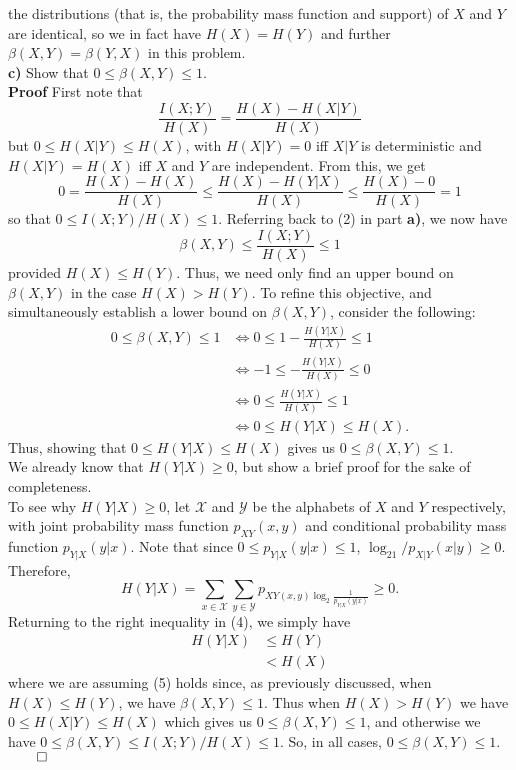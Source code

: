 \documentclass[11pt, letterpaper]{article}
\newcommand{\mc}[1]{\mathcal{#1}}
\begin{document}
the distributions (that is, the probability mass function and support) of $X$ and $Y$ are identical, so we in fact have $H(X)=H(Y)$ and further $\beta(X,Y)=\beta(Y,X)$ in this problem.\\[10pt]
{\bf c)} Show that $0\leq \beta(X,Y)\leq 1$.\\[10pt]
{\bf Proof} First note that
\[\frac{I(X;Y)}{H(X)}=\frac{H(X)-H(X|Y)}{H(X)}\]
but $0\leq H(X|Y)\leq H(X)$, with $H(X|Y)=0$ iff $X|Y$ is deterministic and $H(X|Y)=H(X)$ iff $X$ and $Y$ are independent.
From this, we get
\[0=\frac{H(X)-H(X)}{H(X)}\leq\frac{H(X)-H(Y|X)}{H(X)}\leq\frac{H(X)-0}{H(X)}=1\]
so that $0\leq I(X;Y)/H(X)\leq 1$. Referring back to (2) in part {\bf a)}, we now have 
\[\beta(X,Y)\leq \frac{I(X;Y)}{H(X)}\leq 1\]
provided $H(X)\leq H(Y)$. Thus, we need only find an upper bound on $\beta(X,Y)$ in the case $H(X)>H(Y)$. To refine this objective, and
simultaneously establish a lower bound on $\beta(X,Y)$, consider the following:
\begin{align*}
    0\leq\beta(X,Y)\leq 1&\Leftrightarrow 0\leq 1-\frac{H(Y|X)}{H(X)}\leq 1\\
    &\Leftrightarrow -1\leq -\frac{H(Y|X)}{H(X)}\leq 0\\
    &\Leftrightarrow 0\leq\frac{H(Y|X)}{H(X)}\leq 1\\
    &\Leftrightarrow 0\leq H(Y|X)\leq H(X).\tag{4}
\end{align*}
Thus, showing that $0\leq H(Y|X)\leq H(X)$ gives us $0\leq\beta(X,Y)\leq 1$.\\[10pt]
We already know that $H(Y|X)\geq 0$, but show a brief proof for the sake of completeness. \\[10pt]
To see why $H(Y|X)\geq 0$, let $\mc{X}$ and $\mc{Y}$ be the alphabets of $X$ and $Y$ respectively, with joint probability mass function $p_{XY}(x,y)$ and
conditional probability mass function $p_{Y|X}(y|x)$. Note that since $0\leq p_{Y|X}(y|x)\leq 1$, $\log_21/p_{X|Y}(x|y)\geq 0$. Therefore,
\[H(Y|X)=\sum_{x\in\mc{X}}\sum_{y\in\mc{Y}}p_{XY(x,y)\log_2\frac{1}{p_{Y|X}(y|x)}}\geq 0.\]
Returning to the right inequality in (4), we simply have
\begin{align*}
    H(Y|X)&\leq H(Y)\tag{since conditioning reduces entropy}\\
    &<H(X)\tag{5}
\end{align*}
where we are assuming (5) holds since, as previously discussed, when $H(X)\leq H(Y)$, we have $\beta(X,Y)\leq 1$. Thus when $H(X)>H(Y)$ we have $0\leq H(X|Y)\leq H(X)$ which gives us $0\leq \beta(X,Y)\leq 1$, 
and otherwise we have $0\leq\beta(X,Y)\leq I(X;Y)/H(X)\leq 1$. So, in all cases, $0\leq \beta(X,Y)\leq 1$.\hfill{$\qed$}\\[10pt]
\end{document}

